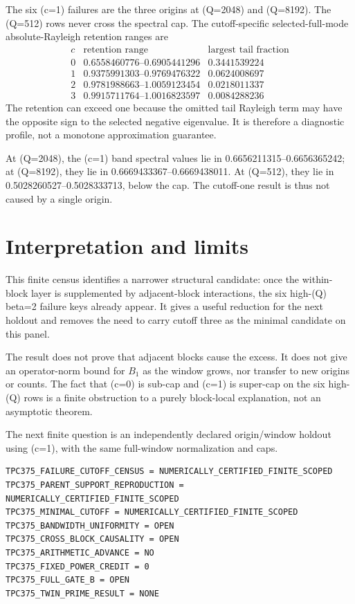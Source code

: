 \documentclass[10pt]{article}
\begin{document}
The six (c=1) failures are the three origins at (Q=2048) and (Q=8192).
The (Q=512) rows never cross the spectral cap.  The cutoff-specific
selected-full-mode absolute-Rayleigh retention ranges are
\[
\begin{array}{c|c|c}
c&\text{retention range}&\text{largest tail fraction}\\ \hline
0&0.6558460776\text{--}0.6905441296&0.3441539224\\
1&0.9375991303\text{--}0.9769476322&0.0624008697\\
2&0.9781988663\text{--}1.0059123454&0.0218011337\\
3&0.9915711764\text{--}1.0016823597&0.0084288236
\end{array}
\]
The retention can exceed one because the omitted tail Rayleigh term may have
the opposite sign to the selected negative eigenvalue.  It is therefore a
diagnostic profile, not a monotone approximation guarantee.

At (Q=2048), the (c=1) band spectral values lie in
0.6656211315--0.6656365242; at (Q=8192), they lie in
0.6669433367--0.6669438011.  At (Q=512), they lie in
0.5028260527--0.5028333713, below the cap.  The cutoff-one result is thus
not caused by a single origin.

\section{Interpretation and limits}

This finite census identifies a narrower structural candidate: once the
within-block layer is supplemented by adjacent-block interactions, the six
high-(Q) beta=2 failure keys already appear.  It gives a useful reduction
for the next holdout and removes the need to carry cutoff three as the
minimal candidate on this panel.

The result does not prove that adjacent blocks cause the excess.  It does not
give an operator-norm bound for \(B_1\) as the window grows, nor transfer to
new origins or counts.  The fact that (c=0) is sub-cap and (c=1) is
super-cap on the six high-(Q) rows is a finite obstruction to a purely
block-local explanation, not an asymptotic theorem.

The next finite question is an independently declared origin/window holdout
using (c=1), with the same full-window normalization and caps.

{\small
\begin{verbatim}
TPC375_FAILURE_CUTOFF_CENSUS = NUMERICALLY_CERTIFIED_FINITE_SCOPED
TPC375_PARENT_SUPPORT_REPRODUCTION = NUMERICALLY_CERTIFIED_FINITE_SCOPED
TPC375_MINIMAL_CUTOFF = NUMERICALLY_CERTIFIED_FINITE_SCOPED
TPC375_BANDWIDTH_UNIFORMITY = OPEN
TPC375_CROSS_BLOCK_CAUSALITY = OPEN
TPC375_ARITHMETIC_ADVANCE = NO
TPC375_FIXED_POWER_CREDIT = 0
TPC375_FULL_GATE_B = OPEN
TPC375_TWIN_PRIME_RESULT = NONE
\end{verbatim}
}
\end{document}

